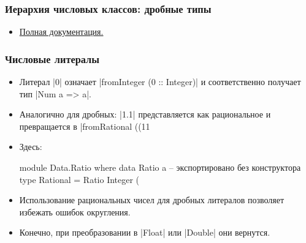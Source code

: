 \documentclass[10pt]{beamer}
\begin{document}
\begin{frame}[fragile]
  \frametitle{Иерархия числовых классов: дробные типы}
  \begin{itemize}
    \begin{haskell}
      class Fractional a => Floating a where 
          exp, log, sqrt, (**), logBase, 
          pi, sin, cos, ...

      class (Real a, Fractional a) => RealFrac a where 
          properFraction :: Integral b => a -> (b, a)
          truncate, round, ceiling, floor :: 
              Integral b => a -> b

      class (RealFrac a, Floating a) => RealFloat a where
          isNaN, isInfinite :: a -> Bool
          ...
          
      fromIntegral :: (Integral a, Num b) => a -> b
      realToFrac :: (Real a, Fractional b) => a -> b
    \end{haskell}
    \item \href{http://hackage.haskell.org/package/base-4.16.4.0/docs/Prelude.html#g:7}{Полная документация.}
  \end{itemize}
\end{frame}

\begin{frame}[fragile]
  \frametitle{Числовые литералы}
  \begin{itemize}
    \item Литерал \haskinline|0| означает \haskinline|fromInteger (0 :: Integer)| и соответственно получает тип \pause\haskinline|Num a => a|.
    \item Аналогично для дробных: \haskinline|1.1| представляется как рациональное и превращается в \haskinline|fromRational ((11 %
    \item Здесь:
          \begin{haskell}
            module Data.Ratio where
              data Ratio a -- экспортировано без конструктора
              type Rational = Ratio Integer
              (%
          \end{haskell}
          \pause
    \item Использование рациональных чисел для дробных литералов позволяет избежать ошибок округления.\pause
    \item Конечно, при преобразовании в \haskinline|Float| или \haskinline|Double| они вернутся.
  \end{itemize}
\end{frame}
\end{document}
